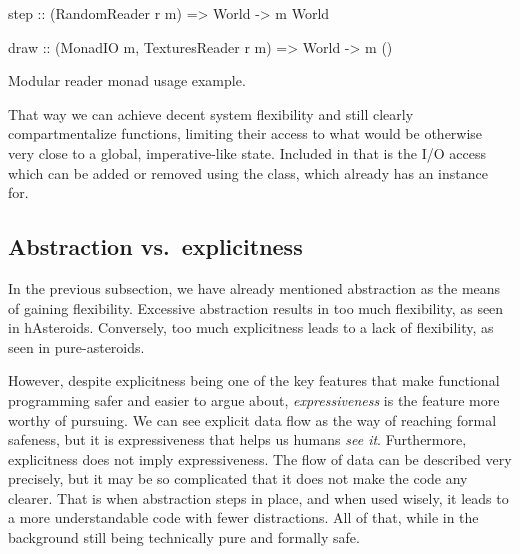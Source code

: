 \documentclass[
  digital, %
  color,   %
  table,   %
  oneside, %
  lof,     %
  lot,     %
]{fithesis3}
\newcommand{\vs}{vs.\ }
\begin{document}
{\begin{listing}
\begin{haskell}
step :: (RandomReader r m) => World -> m World

draw :: (MonadIO m, TexturesReader r m) => World -> m ()
\end{haskell}
\caption{Modular reader monad usage example.}
\label{lst:usedream}
\end{listing}

That way we can achieve decent system flexibility and still clearly compartmentalize
functions, limiting their access to what would be otherwise very close to a global,
imperative-like state. Included in that is the  I/O access which can be added or removed
using the  class, which  already has an instance for.




\subsection{Abstraction \vs explicitness}

In the previous subsection, we have already mentioned abstraction as the means
of gaining flexibility. Excessive abstraction results in too much flexibility,
as seen in hAsteroids. Conversely, too much explicitness leads to a lack of flexibility,
as seen in pure-asteroids.

However, despite explicitness being one of the key features that make functional
programming safer and easier to argue about, \emph{expressiveness} is the feature
more worthy of pursuing. We can see explicit data flow as the way of reaching
formal safeness, but it is expressiveness that helps us humans \emph{see it}.
Furthermore, explicitness does not imply expressiveness. The flow of data can be
described very precisely, but it may be so complicated that it does not make the code any clearer.
That is when abstraction steps in place, and when used wisely, it leads to a
more understandable code with fewer distractions. All of that, while in the background
still being technically pure and formally safe.

}
\end{document}
